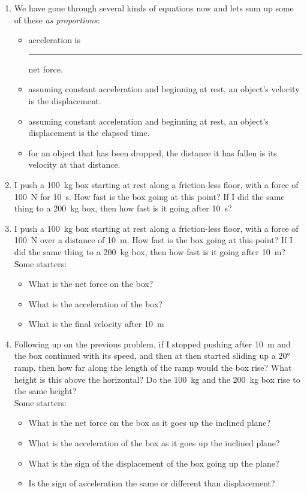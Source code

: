 \begin{enumerate}
\setlength\itemsep{1 in}

\item 
We have gone through several kinds of equations now and lets sum up some of these \emph{as proportions}:
\begin{itemize}
	\setlength\itemsep{.5 in}
	\item acceleration is \rule{1in}{0.1mm} net force.
	\item assuming constant acceleration and beginning at rest, an object's velocity is \blank the displacement.
	\item assuming constant acceleration and beginning at rest, an object's displacement is \blank the elapsed time.
	\item for an object that has been dropped, the distance it has fallen is \blank its velocity at that distance.
\end{itemize} 
\medskip


\item
I push a \SI{100}{kg} box starting at rest along a friction-less floor, with a force of \SI{100}{\newton} for \SI{10}{\second}. How fast is the box going at this point? If I did the same thing to a \SI{200}{kg} box, then how fast is it going after \SI{10}{s}?
\hugeskip

\item
I push a \SI{100}{kg} box starting at rest along a friction-less floor, with a force of \SI{100}{\newton} over a distance of \SI{10}{m}. How fast is the box going at this point? If I did the same thing to a \SI{200}{kg} box, then how fast is it going after \SI{10}{m}?\\
Some starters:
\begin{itemize}
	\item What is the net force on the box?
	\item What is the acceleration of the box?
	\item What is the final velocity after \SI{10}{\meter}
\end{itemize}
\hugeskip


\item
Following up on the previous problem, if I stopped pushing after \SI{10}{m} and the box continued with its speed, and then at then started sliding up a \ang{20} ramp, then how far along the length of the ramp would the box rise? What height is this above the horizontal?  Do the \SI{100}{kg} and the \SI{200}{kg} box rise to the same height?\\
Some starters:
\begin{itemize}
	\item What is the net force on the box as it goes up the inclined plane?
	\item What is the acceleration of the box as it goes up the inclined plane?
	\item What is the sign of the displacement of the box going up the plane?
	\item Is the sign of acceleration the same or different than displacement? 
\end{itemize}
\hugeskip



\end{enumerate}

